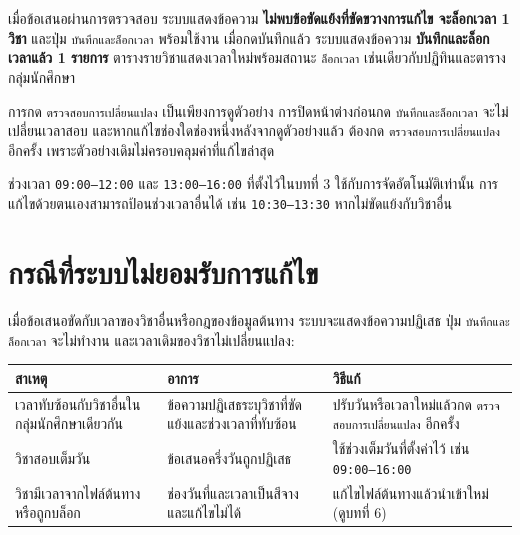 \begin{expected}
เมื่อข้อเสนอผ่านการตรวจสอบ ระบบแสดงข้อความ
\textbf{ไม่พบข้อขัดแย้งที่ขัดขวางการแก้ไข จะล็อกเวลา 1 วิชา}
และปุ่ม \texttt{บันทึกและล็อกเวลา} พร้อมใช้งาน เมื่อกดบันทึกแล้ว
ระบบแสดงข้อความ \textbf{บันทึกและล็อกเวลาแล้ว 1 รายการ}
ตารางรายวิชาแสดงเวลาใหม่พร้อมสถานะ \texttt{ล็อกเวลา}
เช่นเดียวกับปฏิทินและตารางกลุ่มนักศึกษา
\end{expected}


\begin{note}
การกด \texttt{ตรวจสอบการเปลี่ยนแปลง} เป็นเพียงการดูตัวอย่าง
การปิดหน้าต่างก่อนกด \texttt{บันทึกและล็อกเวลา} จะไม่เปลี่ยนเวลาสอบ
และหากแก้ไขช่องใดช่องหนึ่งหลังจากดูตัวอย่างแล้ว ต้องกด
\texttt{ตรวจสอบการเปลี่ยนแปลง} อีกครั้ง เพราะตัวอย่างเดิมไม่ครอบคลุมค่าที่แก้ไขล่าสุด
\end{note}

ช่วงเวลา \texttt{09:00--12:00} และ \texttt{13:00--16:00} ที่ตั้งไว้ในบทที่ 3
ใช้กับการจัดอัตโนมัติเท่านั้น การแก้ไขด้วยตนเองสามารถป้อนช่วงเวลาอื่นได้
เช่น \texttt{10:30--13:30} หากไม่ขัดแย้งกับวิชาอื่น

\section{กรณีที่ระบบไม่ยอมรับการแก้ไข}

เมื่อข้อเสนอขัดกับเวลาของวิชาอื่นหรือกฎของข้อมูลต้นทาง ระบบจะแสดงข้อความปฏิเสธ
ปุ่ม \texttt{บันทึกและล็อกเวลา} จะไม่ทำงาน และเวลาเดิมของวิชาไม่เปลี่ยนแปลง:

\begin{center}
\small
\begin{tabular}{L{4.2cm}L{4.6cm}L{5.2cm}}
\toprule
\textbf{สาเหตุ} & \textbf{อาการ} & \textbf{วิธีแก้} \\
\midrule
เวลาทับซ้อนกับวิชาอื่นในกลุ่มนักศึกษาเดียวกัน &
ข้อความปฏิเสธระบุวิชาที่ขัดแย้งและช่วงเวลาที่ทับซ้อน &
ปรับวันหรือเวลาใหม่แล้วกด \texttt{ตรวจสอบการเปลี่ยนแปลง} อีกครั้ง \\
วิชาสอบเต็มวัน &
ข้อเสนอครึ่งวันถูกปฏิเสธ &
ใช้ช่วงเต็มวันที่ตั้งค่าไว้ เช่น \texttt{09:00--16:00} \\
วิชามีเวลาจากไฟล์ต้นทางหรือถูกบล็อก &
ช่องวันที่และเวลาเป็นสีจางและแก้ไขไม่ได้ &
แก้ไขไฟล์ต้นทางแล้วนำเข้าใหม่ (ดูบทที่ 6) \\
\bottomrule
\end{tabular}
\end{center}

